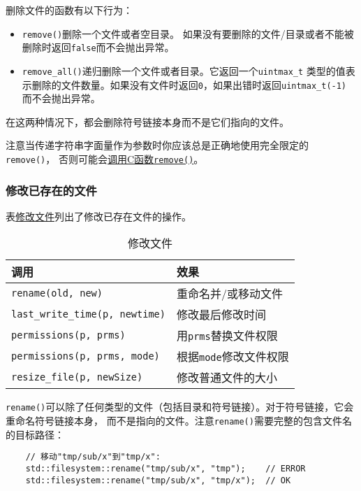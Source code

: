 删除文件的函数有以下行为：
\begin{itemize}
    \item \texttt{remove()}删除一个文件或者空目录。
    如果没有要删除的文件/目录或者不能被删除时返回\texttt{false}而不会抛出异常。
    \item \texttt{remove\_all()}递归删除一个文件或者目录。它返回一个\texttt{uintmax\_t}
    类型的值表示删除的文件数量。如果没有文件时返回\texttt{0}，如果出错时返回\texttt{uintmax\_t(-1)}
    而不会抛出异常。
\end{itemize}
在这两种情况下，都会删除符号链接本身而不是它们指向的文件。

注意当传递字符串字面量作为参数时你应该总是正确地使用完全限定的\texttt{remove()}，
否则可能会\hyperref[ADL导致意外行为]{调用C函数\texttt{remove()}}。

\subsubsection{修改已存在的文件}\label{ch20.4.4.2}
表\hyperref[t20.17]{修改文件}列出了修改已存在文件的操作。
\begin{table}[htb]
    \centering
    \begin{tabular}{l|l}
        \hline
        \textbf{调用}                            & \textbf{效果}           \\
        \hline
        \texttt{rename(old, new)}              & 重命名并/或移动文件            \\
        \texttt{last\_write\_time(p, newtime)} & 修改最后修改时间              \\
        \texttt{permissions(p, prms)}          & 用\texttt{prms}替换文件权限  \\
        \texttt{permissions(p, prms, mode)}    & 根据\texttt{mode}修改文件权限 \\
        \texttt{resize\_file(p, newSize)}      & 修改普通文件的大小             \\
        \hline
    \end{tabular}
    \caption{修改文件}
    \label{t20.17}
\end{table}

\texttt{rename()}可以除了任何类型的文件（包括目录和符号链接）。对于符号链接，它会重命名符号链接本身，
而不是指向的文件。注意\texttt{rename()}需要完整的包含文件名的目标路径：
\begin{lstlisting}
    // 移动"tmp/sub/x"到"tmp/x":
    std::filesystem::rename("tmp/sub/x", "tmp");    // ERROR
    std::filesystem::rename("tmp/sub/x", "tmp/x");  // OK
\end{lstlisting}

